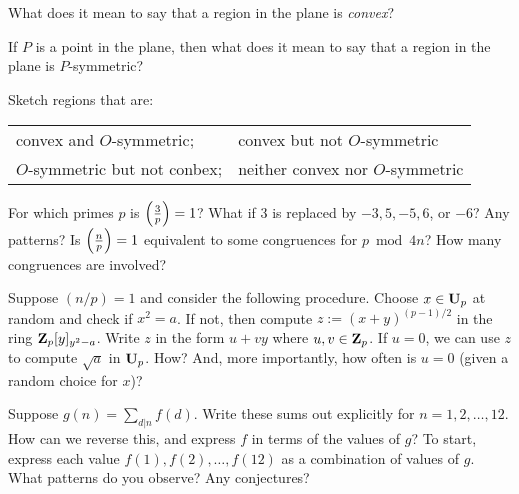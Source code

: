 \documentclass[11pt]{rosspset}
\begin{document}
\maketitle


\begin{terminology}
    \item What does it mean to say that a region in the plane is \textit{convex}?
    \item If $P$ is a point in the plane, then what does it mean to say that a region in the plane is $P$-symmetric?
\end{terminology}

\numerical

\begin{problem}
    Sketch regions that are: \begin{tabular}{ll}
        convex and $O$-symmetric; & convex but not $O$-symmetric \\ $O$-symmetric but not conbex; & neither convex nor $O$-symmetric \\
    \end{tabular}
\end{problem}

\begin{problem}
    For which primes $p$ is $\left(\frac{3}{p}\right) = 1$? What if $3$ is replaced by $-3, 5, -5, 6$, or $-6$? Any patterns? Is $\left(\frac{n}{p}\right) = 1$ equivalent to some congruences for $p\bmod 4n$? How many congruences are involved?
\end{problem}

\exploration

\begin{problem}
    Suppose $(n/p)=1$ and consider the following procedure. Choose $x \in\mathbf{U}_p$ at random and check if $x^2=a$. If not, then compute $z:= (x+y)^{(p-1)/2}$ in the ring $\mathbf{Z}_p[y]_{y^2-a}$. Write $z$ in the form $u+vy$ where $u,v\in\mathbf{Z}_p$. If $u=0$, we can use $z$ to compute $\sqrt{a}$ in $\mathbf{U}_p$. How? And, more importantly, how often is $u=0$ (given a random choice for $x$)?
\end{problem}

\begin{problem}
    Suppose $\displaystyle g(n)=\sum_{d|n} f(d)$. Write these sums out explicitly for $n=1,2,\dots,12$. How can we reverse this, and express $f$ in terms of the values of $g$? To start, express each value $f(1),f(2),\dots,f(12)$ as a combination of values of $g$. What patterns do you observe? Any conjectures?
\end{problem}
\end{document}
